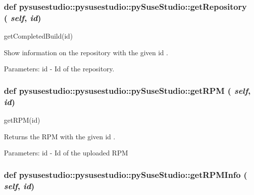 \hypertarget{classpysusestudio_1_1pysusestudio_1_1py_suse_studio_ad68a641c2543f9da9937bea46d9a60f1}{
\subsubsection[{getRepository}]{\setlength{\rightskip}{0pt plus 5cm}def pysusestudio::pysusestudio::pySuseStudio::getRepository ( {\em self}, \/   {\em id})}}
\label{classpysusestudio_1_1pysusestudio_1_1py_suse_studio_ad68a641c2543f9da9937bea46d9a60f1}
\begin{DoxyVerb}getCompletedBuild(id)

       Show information on the repository with the given id .
        
            Parameters:
id - Id of the repository.

\end{DoxyVerb}
 \hypertarget{classpysusestudio_1_1pysusestudio_1_1py_suse_studio_ae3e37842905fcb2123c399ca174ac131}{
\subsubsection[{getRPM}]{\setlength{\rightskip}{0pt plus 5cm}def pysusestudio::pysusestudio::pySuseStudio::getRPM ( {\em self}, \/   {\em id})}}
\label{classpysusestudio_1_1pysusestudio_1_1py_suse_studio_ae3e37842905fcb2123c399ca174ac131}
\begin{DoxyVerb}getRPM(id)

       Returns the RPM with the given id .
        
            Parameters:
id - Id of the uploaded RPM

\end{DoxyVerb}
 \hypertarget{classpysusestudio_1_1pysusestudio_1_1py_suse_studio_ae469f2a986932d4851947bb747522eaa}{
\subsubsection[{getRPMInfo}]{\setlength{\rightskip}{0pt plus 5cm}def pysusestudio::pysusestudio::pySuseStudio::getRPMInfo ( {\em self}, \/   {\em id})}}
